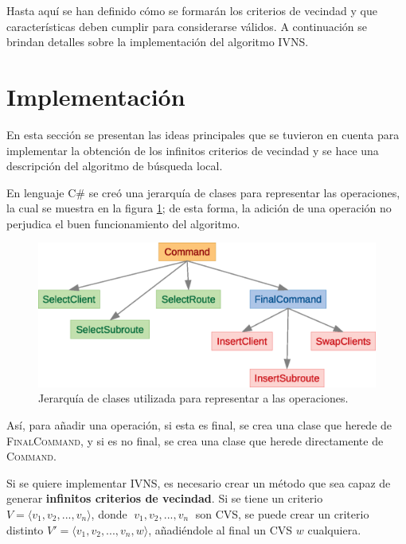 \documentclass[a4paper,10pt,twocolumn]{article}
\begin{document}
	Hasta aquí se han definido cómo se formarán los criterios de vecindad y que
	características deben cumplir para considerarse válidos. A continuación se brindan 
	detalles sobre la implementación del algoritmo IVNS.
\section{Implementación}\label{sec:impl}
	En esta sección se presentan las ideas principales que se tuvieron en cuenta para 
	implementar la obtención de los infinitos criterios de vecindad y se hace una 
	des\-crip\-ción del algoritmo de búsqueda local.

	En lenguaje \textsc{C\#} se creó una jerarquía de clases para representar las 
	operaciones, la cual se muestra en la figura \ref{fig:hierarchy}; de esta forma,
	la adición de una operación no perjudica el buen funcionamiento del algoritmo.

	\begin{figure}[htb]
		\begin{center}
			\includegraphics[scale=.43]{Graphics/hierarchy.eps}
		\end{center}
		\caption{Jerarquía de clases utilizada para representar a las operaciones.
		\label{fig:hierarchy}}
	\end{figure}
	
	Así, para añadir una operación, si esta es final, se crea una clase que herede de 
	\textsc{FinalCommand}, y si es no final, se crea una clase que herede directamente
	de \textsc{Command}.

	Si se quiere implementar IVNS, es necesario crear un método que sea capaz de generar 
	\textbf{infinitos criterios de vecindad}. Si se tiene un criterio 
	$V = \langle v_1, v_2, ..., v_n \rangle$, donde $\; v_1, v_2, ..., v_n \;$ son CVS,
	se puede crear un criterio distinto $V' = \langle v_1, v_2, ..., v_n, w \rangle$, 
	añadiéndole al final un CVS $w$ cualquiera. 
	
\end{document}
